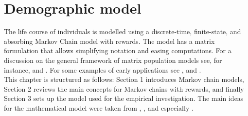 \documentclass[\main/main.tex]{subfiles}
\begin{document}
\chapter{Demographic model}

The life course of individuals is modelled using a discrete-time, finite-state, and absorbing Markov Chain model with rewards.
The model has a matrix formulation that allows simplifying notation and easing computations. For a discussion on the general framework of matrix population models see, for instance, \cite{Caswell2001} and \cite{Keyfitz2005}. For some examples of early applications see \citet{Leslie1945, Leslie1948}, \cite{Keyfitz1964} and \cite{Rogers1966}.\\

This chapter is structured as follows: Section 1 introduces Markov chain models, Section 2 reviews the main concepts for Markov chains with rewards, and finally Section 3 sets up the model used for the empirical investigation.
The main ideas for the mathematical model were taken from \cite{Caswell2006}, \cite{VanDaalen2017}, and especially \cite{Caswell2018}.







\end{document}
